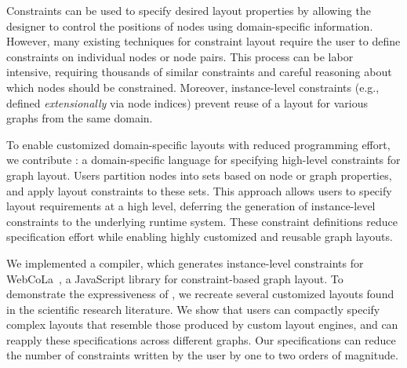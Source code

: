 Constraints can be used to specify desired layout properties by
allowing the designer to control the positions of nodes using
domain-specific information.  However, many existing techniques
for constraint layout require the user to define constraints
on individual nodes or node pairs. This process can be labor
intensive, requiring thousands of similar constraints and careful reasoning
about which nodes should be constrained. Moreover, instance-level constraints 
(e.g., defined \emph{extensionally} via node indices) prevent
reuse of a layout for various graphs from the same domain.

To enable customized domain-specific layouts with reduced
programming effort, we contribute \projectname: a domain-specific language for
specifying high-level constraints for graph layout. Users partition nodes
into sets based on node or graph properties, and apply layout constraints
to these sets. This approach allows users to specify layout
requirements at a high level, deferring the generation of
instance-level constraints to the underlying runtime system. These constraint
definitions reduce specification effort while enabling highly
customized and reusable graph layouts.

We implemented a \projectname compiler, which generates instance-level 
constraints for WebCoLa~\cite{WebCoLa}, a JavaScript library for constraint-based
graph layout. To demonstrate the expressiveness of \projectname, we
recreate several customized layouts found in the scientific research 
literature. We show that users can compactly specify complex layouts that resemble
those produced by custom layout engines, and can reapply these
specifications across different graphs. Our \projectname specifications
can reduce the number of constraints written by the user by one to two 
orders of magnitude.
